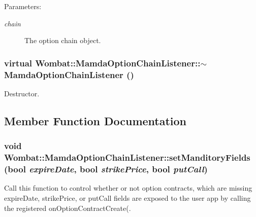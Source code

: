 \begin{Desc}
\item[Parameters:]
\begin{description}
\item[{\em chain}]The option chain object. \end{description}
\end{Desc}
\hypertarget{classWombat_1_1MamdaOptionChainListener_3417b532649e5cba25f53cb9b3c46c30}{
\subsubsection[$\sim$MamdaOptionChainListener]{\setlength{\rightskip}{0pt plus 5cm}virtual Wombat::Mamda\-Option\-Chain\-Listener::$\sim$Mamda\-Option\-Chain\-Listener ()}}
\label{classWombat_1_1MamdaOptionChainListener_3417b532649e5cba25f53cb9b3c46c30}


Destructor. 



\subsection{Member Function Documentation}
\hypertarget{classWombat_1_1MamdaOptionChainListener_8fb40267dabfb52a3bc1ae63e10f84e5}{
\subsubsection[setManditoryFields]{\setlength{\rightskip}{0pt plus 5cm}void Wombat::Mamda\-Option\-Chain\-Listener::set\-Manditory\-Fields (bool {\em expire\-Date}, bool {\em strike\-Price}, bool {\em put\-Call})}}
\label{classWombat_1_1MamdaOptionChainListener_8fb40267dabfb52a3bc1ae63e10f84e5}


Call this function to control whether or not option contracts, which are missing expire\-Date, strike\-Price, or put\-Call fields are exposed to the user app by calling the registered on\-Option\-Contract\-Create(. 

